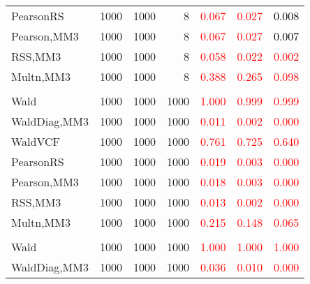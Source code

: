 \documentclass[
]{article}
\begin{document}
\begin{table}[H]
{\begin{tabular}[t]{lrrrrrr}
\hspace{1em}PearsonRS & 1000 & 1000 & 8 & \textcolor{red}{0.067} & \textcolor{red}{0.027} & \textcolor{black}{0.008}\\
\hspace{1em}Pearson,MM3 & 1000 & 1000 & 8 & \textcolor{red}{0.067} & \textcolor{red}{0.027} & \textcolor{black}{0.007}\\
\hspace{1em}RSS,MM3 & 1000 & 1000 & 8 & \textcolor{red}{0.058} & \textcolor{red}{0.022} & \textcolor{red}{0.002}\\
\hspace{1em}Multn,MM3 & 1000 & 1000 & 8 & \textcolor{red}{0.388} & \textcolor{red}{0.265} & \textcolor{red}{0.098}\\
\addlinespace[0.3em]
\multicolumn{7}{l}{\textbf{1F 15V}}\\
\hspace{1em}Wald & 1000 & 1000 & 1000 & \textcolor{red}{1.000} & \textcolor{red}{0.999} & \textcolor{red}{0.999}\\
\hspace{1em}WaldDiag,MM3 & 1000 & 1000 & 1000 & \textcolor{red}{0.011} & \textcolor{red}{0.002} & \textcolor{red}{0.000}\\
\hspace{1em}WaldVCF & 1000 & 1000 & 1000 & \textcolor{red}{0.761} & \textcolor{red}{0.725} & \textcolor{red}{0.640}\\
\hspace{1em}PearsonRS & 1000 & 1000 & 1000 & \textcolor{red}{0.019} & \textcolor{red}{0.003} & \textcolor{red}{0.000}\\
\hspace{1em}Pearson,MM3 & 1000 & 1000 & 1000 & \textcolor{red}{0.018} & \textcolor{red}{0.003} & \textcolor{red}{0.000}\\
\hspace{1em}RSS,MM3 & 1000 & 1000 & 1000 & \textcolor{red}{0.013} & \textcolor{red}{0.002} & \textcolor{red}{0.000}\\
\hspace{1em}Multn,MM3 & 1000 & 1000 & 1000 & \textcolor{red}{0.215} & \textcolor{red}{0.148} & \textcolor{red}{0.065}\\
\addlinespace[0.3em]
\multicolumn{7}{l}{\textbf{2F 10V}}\\
\hspace{1em}Wald & 1000 & 1000 & 1000 & \textcolor{red}{1.000} & \textcolor{red}{1.000} & \vphantom{1} \textcolor{red}{1.000}\\
\hspace{1em}WaldDiag,MM3 & 1000 & 1000 & 1000 & \textcolor{red}{0.036} & \textcolor{red}{0.010} & \textcolor{red}{0.000}\\

\end{tabular}}
\end{table}
\end{document}
